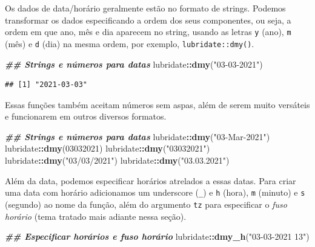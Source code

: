 \documentclass[
]{article}
\newenvironment{Shaded}{\begin{snugshade}}{\end{snugshade}}
\newcommand{\DecValTok}[1]{\textcolor[rgb]{0.00,0.00,0.81}{#1}}
\newcommand{\DocumentationTok}[1]{\textcolor[rgb]{0.56,0.35,0.01}{\textbf{\textit{#1}}}}
\newcommand{\FunctionTok}[1]{\textcolor[rgb]{0.13,0.29,0.53}{\textbf{#1}}}
\newcommand{\NormalTok}[1]{#1}
\newcommand{\SpecialCharTok}[1]{\textcolor[rgb]{0.81,0.36,0.00}{\textbf{#1}}}
\newcommand{\StringTok}[1]{\textcolor[rgb]{0.31,0.60,0.02}{#1}}
\begin{document}
Os dados de data/horário geralmente estão no formato de strings. Podemos transformar os dados especificando a ordem dos seus componentes, ou seja, a ordem em que ano, mês e dia aparecem no string, usando as letras \texttt{y} (ano), \texttt{m} (mês) e \texttt{d} (dia) na mesma ordem, por exemplo, \texttt{lubridate::dmy()}.

\begin{Shaded}
\begin{Highlighting}[]
\DocumentationTok{\#\# Strings e números para datas}
\NormalTok{lubridate}\SpecialCharTok{::}\FunctionTok{dmy}\NormalTok{(}\StringTok{"03{-}03{-}2021"}\NormalTok{)}
\end{Highlighting}
\end{Shaded}

\begin{verbatim}
## [1] "2021-03-03"
\end{verbatim}

Essas funções também aceitam números sem aspas, além de serem muito versáteis e funcionarem em outros diversos formatos.

\begin{Shaded}
\begin{Highlighting}[]
\DocumentationTok{\#\# Strings e números para datas}
\NormalTok{lubridate}\SpecialCharTok{::}\FunctionTok{dmy}\NormalTok{(}\StringTok{"03{-}Mar{-}2021"}\NormalTok{)}
\NormalTok{lubridate}\SpecialCharTok{::}\FunctionTok{dmy}\NormalTok{(}\DecValTok{03032021}\NormalTok{)}
\NormalTok{lubridate}\SpecialCharTok{::}\FunctionTok{dmy}\NormalTok{(}\StringTok{"03032021"}\NormalTok{)}
\NormalTok{lubridate}\SpecialCharTok{::}\FunctionTok{dmy}\NormalTok{(}\StringTok{"03/03/2021"}\NormalTok{)}
\NormalTok{lubridate}\SpecialCharTok{::}\FunctionTok{dmy}\NormalTok{(}\StringTok{"03.03.2021"}\NormalTok{)}
\end{Highlighting}
\end{Shaded}

Além da data, podemos especificar horários atrelados a essas datas. Para criar uma data com horário adicionamos um underscore (\texttt{\_}) e \texttt{h} (hora), \texttt{m} (minuto) e \texttt{s} (segundo) ao nome da função, além do argumento \texttt{tz} para especificar o \emph{fuso horário} (tema tratado mais adiante nessa seção).

\begin{Shaded}
\begin{Highlighting}[]
\DocumentationTok{\#\# Especificar horários e fuso horário}
\NormalTok{lubridate}\SpecialCharTok{::}\FunctionTok{dmy\_h}\NormalTok{(}\StringTok{"03{-}03{-}2021 13"}\NormalTok{)}
\end{Highlighting}
\end{Shaded}
\end{document}
